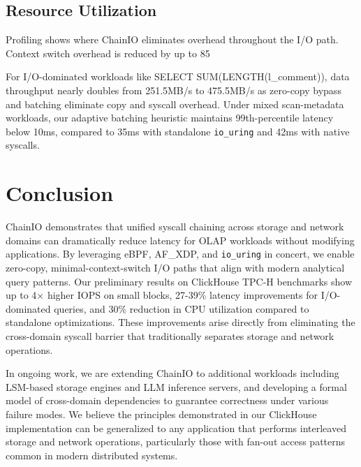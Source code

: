 \documentclass[sigconf,10pt]{acmart}
\newcommand{\sys}{ChainIO\xspace}
\begin{document}
\subsection{Resource Utilization}

Profiling shows where \sys eliminates overhead throughout the I/O path. Context switch overhead is reduced by up to 85%

For I/O-dominated workloads like SELECT SUM(LENGTH(l\_comment)), data throughput nearly doubles from 251.5MB/s to 475.5MB/s as zero-copy bypass and batching eliminate copy and syscall overhead. Under mixed scan-metadata workloads, our adaptive batching heuristic maintains 99th-percentile latency below 10ms, compared to 35ms with standalone \texttt{io\_uring} and 42ms with native syscalls.

\section{Conclusion}

\sys demonstrates that unified syscall chaining across storage and network domains can dramatically reduce latency for OLAP workloads without modifying applications. By leveraging eBPF, AF\_XDP, and \texttt{io\_uring} in concert, we enable zero-copy, minimal-context-switch I/O paths that align with modern analytical query patterns. Our preliminary results on ClickHouse TPC-H benchmarks show up to 4× higher IOPS on small blocks, 27-39\% latency improvements for I/O-dominated queries, and 30\% reduction in CPU utilization compared to standalone optimizations. These improvements arise directly from eliminating the cross-domain syscall barrier that traditionally separates storage and network operations.

In ongoing work, we are extending \sys to additional workloads including LSM-based storage engines and LLM inference servers, and developing a formal model of cross-domain dependencies to guarantee correctness under various failure modes. We believe the principles demonstrated in our ClickHouse implementation can be generalized to any application that performs interleaved storage and network operations, particularly those with fan-out access patterns common in modern distributed systems.



\end{document}
